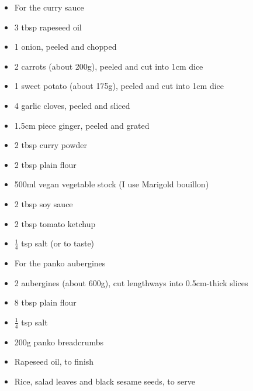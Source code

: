 \documentclass{book}
\begin{document}
\begin{itemize}
\item For the curry sauce
\item 3 tbsp rapeseed oil
\item 1 onion, peeled and chopped
\item 2 carrots (about 200g), peeled and cut into 1cm dice
\item 1 sweet potato (about 175g), peeled and cut into 1cm dice
\item 4 garlic cloves, peeled and sliced
\item 1.5cm piece ginger, peeled and grated
\item 2 tbsp curry powder
\item 2 tbsp plain flour
\item 500ml vegan vegetable stock (I use Marigold bouillon)
\item 2 tbsp soy sauce
\item 2 tbsp tomato ketchup
\item $\frac{1}{4}$ tsp salt (or to taste)
\end{itemize}

\begin{itemize}
\item For the panko aubergines
\item 2 aubergines (about 600g), cut lengthways into 0.5cm-thick slices
\item 8 tbsp plain flour
\item $\frac{1}{4}$ tsp salt
\item 200g panko breadcrumbs
\item Rapeseed oil, to finish
\item Rice, salad leaves and black sesame seeds, to serve
\end{itemize}
\end{document}
